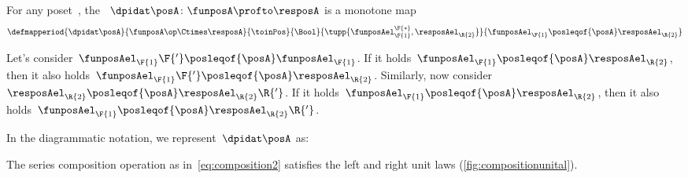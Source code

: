 \begin{definition}
    \label{def:dp-identity}
    For any poset~\posA, the \emph{}~$\dpidat\posA \colon \funposA \profto \resposA$ is a monotone map
    \begin{equation}
        \label{eq:identity}
        \defmapperiod{
            \dpidat\posA
        }{
            \funposA\op \Ctimes \resposA
        }{
            \toinPos
        }{
            \Bool
        }{
            \tupp{\funposAel_\F{1}^\F{*},\resposAel_\R{2}}
        }{
            \funposAel_\F{1} \posleqof{\posA} \resposAel_\R{2}
        }
    \end{equation}
\end{definition}
\begin{remark}
    Let's consider~$\funposAel_\F{1}\F{'} \posleqof{\posA} \funposAel_\F{1}$.
    If it holds~$\funposAel_\F{1}\posleqof{\posA}\resposAel_\R{2}$, then it also holds~$\funposAel_\F{1}\F{'}\posleqof{\posA}\resposAel_\R{2}$.
    Similarly, now consider~$\resposAel_\R{2}\posleqof{\posA}\resposAel_\R{2}\R{'}$.
    If it holds~$\funposAel_\F{1} \posleqof{\posA} \resposAel_\R{2}$, then it also holds~$\funposAel_\F{1} \posleqof{\posA} \resposAel_\R{2}\R{'}$.
\end{remark}
In the diagrammatic notation, we represent~$\dpidat\posA$ as:
%

\begin{lemma}
    \label{lem:compositionunital}
    The series composition operation as in~\cref{eq:composition2} satisfies the left and right unit laws (\cref{fig:compositionunital}).
\end{lemma}

